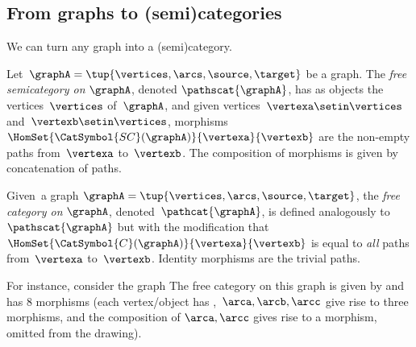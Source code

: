 {\subsection[Categories from graphs]{From graphs to (semi)categories}
\label{sec:catsfromgraphs}

We can turn any graph into a (semi)category.

\begin{ctdefinition}
    \label{def:free-semicategory}

    Let~$\graphA=\tup{\vertices,\arcs,\source,\target}$ be a graph.
    The \emph{free semicategory on} $\graphA$, denoted $\pathscat{\graphA}$, has as objects the vertices~$\vertices$ of~$\graphA$, and given vertices~$\vertexa\setin \vertices$ and~$\vertexb\setin \vertices$, morphisms~$\HomSet{\CatSymbol{SC}(\graphA)}{\vertexa}{\vertexb}$ are the non-empty paths from~$\vertexa$ to~$\vertexb$.
    The composition of morphisms is given by concatenation of paths.
\end{ctdefinition}

\begin{ctdefinition}
    \label{def:free-category}
    Given~a graph $\graphA=\tup{\vertices,\arcs,\source,\target}$, the \emph{free category on} $\graphA$, denoted~$\pathcat{\graphA}$, is defined analogously to $\pathscat{\graphA}$ but with the modification that $\HomSet{\CatSymbol{C}(\graphA)}{\vertexa}{\vertexb}$ is equal to \emph{all} paths from~$\vertexa$ to~$\vertexb$.
    Identity morphisms are the trivial paths.
\end{ctdefinition}

For instance, consider the graph
%
%
The free category on this graph is given by
%
%
and has 8 morphisms (each vertex/object has ,~$\arca,\arcb,\arcc$ give rise to three morphisms, and the composition of $\arca,\arcc$ gives rise to a morphism, omitted from the drawing).

}

